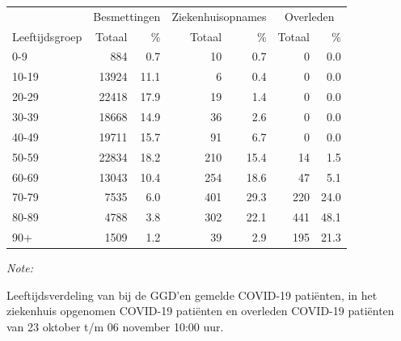 \documentclass[
  english,
  man,floatsintext]{apa6}
\begin{document}
\begin{table}[H]
\centering\begingroup\fontsize{11}{13}\selectfont

\begin{threeparttable}
\begin{tabular}{lrrrrrr}
\toprule
\multicolumn{1}{c}{ } & \multicolumn{2}{c}{Besmettingen} & \multicolumn{2}{c}{Ziekenhuisopnames} & \multicolumn{2}{c}{Overleden} \\
\cmidrule(l{3pt}r{3pt}){2-3} \cmidrule(l{3pt}r{3pt}){4-5} \cmidrule(l{3pt}r{3pt}){6-7}
Leeftijdsgroep & Totaal & \% & Totaal & \% & Totaal & \%\\
\midrule
0-9 & 884 & 0.7 & 10 & 0.7 & 0 & 0.0\\
10-19 & 13924 & 11.1 & 6 & 0.4 & 0 & 0.0\\
20-29 & 22418 & 17.9 & 19 & 1.4 & 0 & 0.0\\
30-39 & 18668 & 14.9 & 36 & 2.6 & 0 & 0.0\\
40-49 & 19711 & 15.7 & 91 & 6.7 & 0 & 0.0\\
50-59 & 22834 & 18.2 & 210 & 15.4 & 14 & 1.5\\
60-69 & 13043 & 10.4 & 254 & 18.6 & 47 & 5.1\\
70-79 & 7535 & 6.0 & 401 & 29.3 & 220 & 24.0\\
80-89 & 4788 & 3.8 & 302 & 22.1 & 441 & 48.1\\
90+ & 1509 & 1.2 & 39 & 2.9 & 195 & 21.3\\
\bottomrule
\end{tabular}
\begin{tablenotes}
\item \textit{Note: } 
\item Leeftijdsverdeling van bij de GGD’en gemelde COVID-19 patiënten, in het ziekenhuis opgenomen COVID-19 patiënten en overleden COVID-19 patiënten van 23 oktober t/m 06 november 10:00 uur.
\end{tablenotes}
\end{threeparttable}
\endgroup{}
\end{table}
\end{document}
